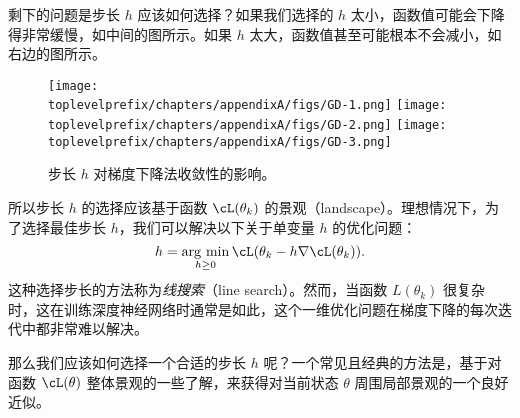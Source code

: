 \documentclass[../../book-main_zh.tex]{subfiles}
\begin{document}
剩下的问题是步长 \(h\) 应该如何选择？如果我们选择的 \(h\) 太小，函数值可能会下降得非常缓慢，如中间的图所示。如果 \(h\) 太大，函数值甚至可能根本不会减小，如右边的图所示。

\begin{figure}[h]
    \centering
    \texttt{[image: \\toplevelprefix/chapters/appendixA/figs/GD-1.png]}
    \hspace{3mm}
    \texttt{[image: \\toplevelprefix/chapters/appendixA/figs/GD-2.png]}
    \hspace{3mm}
    \texttt{[image: \\toplevelprefix/chapters/appendixA/figs/GD-3.png]}
    \caption{步长 \(h\) 对梯度下降法收敛性的影响。}
    \label{fig:step-size}
\end{figure}

所以步长 \(h\) 的选择应该基于函数 \(\cL(\theta_k)\) 的景观（landscape）。理想情况下，为了选择最佳步长 \(h\)，我们可以解决以下关于单变量 \(h\) 的优化问题：
\begin{equation}
    h = \argmin_{h\geq 0} \cL(\theta_k - h\nabla \cL(\theta_k)).
\end{equation}
这种选择步长的方法称为\textit{线搜索}（line search）。然而，当函数 \(L(\theta_k)\) 很复杂时，这在训练深度神经网络时通常是如此，这个一维优化问题在梯度下降的每次迭代中都非常难以解决。

那么我们应该如何选择一个合适的步长 \(h\) 呢？一个常见且经典的方法是，基于对函数 \(\cL(\theta)\) 整体景观的一些了解，来获得对当前状态 \(\theta\) 周围局部景观的一个良好近似。
\end{document}
